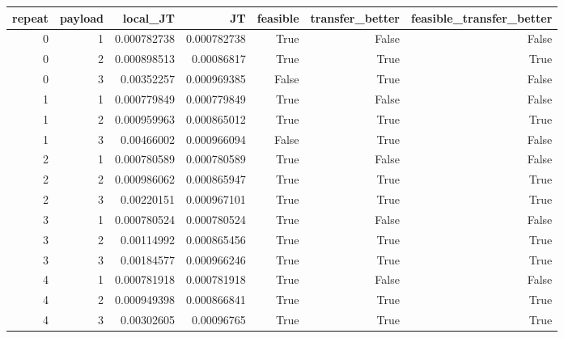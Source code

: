 \begin{tabular}{rrrrrrr}
\toprule
repeat & payload & local\_JT & JT & feasible & transfer\_better & feasible\_transfer\_better \\
\midrule
0 & 1 & 0.000782738 & 0.000782738 & True & False & False \\
0 & 2 & 0.000898513 & 0.00086817 & True & True & True \\
0 & 3 & 0.00352257 & 0.000969385 & False & True & False \\
1 & 1 & 0.000779849 & 0.000779849 & True & False & False \\
1 & 2 & 0.000959963 & 0.000865012 & True & True & True \\
1 & 3 & 0.00466002 & 0.000966094 & False & True & False \\
2 & 1 & 0.000780589 & 0.000780589 & True & False & False \\
2 & 2 & 0.000986062 & 0.000865947 & True & True & True \\
2 & 3 & 0.00220151 & 0.000967101 & True & True & True \\
3 & 1 & 0.000780524 & 0.000780524 & True & False & False \\
3 & 2 & 0.00114992 & 0.000865456 & True & True & True \\
3 & 3 & 0.00184577 & 0.000966246 & True & True & True \\
4 & 1 & 0.000781918 & 0.000781918 & True & False & False \\
4 & 2 & 0.000949398 & 0.000866841 & True & True & True \\
4 & 3 & 0.00302605 & 0.00096765 & True & True & True \\
\bottomrule
\end{tabular}
